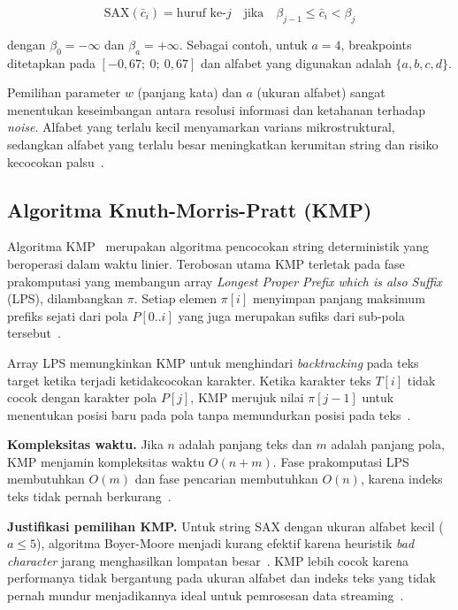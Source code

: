 \documentclass[conference]{IEEEtran}
\begin{document}
\begin{equation}
\text{SAX}(\bar{c}_i) = \text{huruf ke-}j \quad \text{jika} \quad \beta_{j-1} \leq \bar{c}_i < \beta_j
\label{eq:sax}
\end{equation}

\noindent dengan $\beta_0 = -\infty$ dan $\beta_a = +\infty$. Sebagai contoh, untuk $a = 4$, breakpoints ditetapkan pada $[-0{,}67;\ 0;\ 0{,}67]$ dan alfabet yang digunakan adalah $\{a, b, c, d\}$.

Pemilihan parameter $w$ (panjang kata) dan $a$ (ukuran alfabet) sangat menentukan keseimbangan antara resolusi informasi dan ketahanan terhadap \textit{noise}. Alfabet yang terlalu kecil menyamarkan varians mikrostruktural, sedangkan alfabet yang terlalu besar meningkatkan kerumitan string dan risiko kecocokan palsu~\cite{park2019}.

\subsection{Algoritma Knuth-Morris-Pratt (KMP)}

Algoritma KMP~\cite{knuth1977} merupakan algoritma pencocokan string deterministik yang beroperasi dalam waktu linier. Terobosan utama KMP terletak pada fase prakomputasi yang membangun array \textit{Longest Proper Prefix which is also Suffix} (LPS), dilambangkan $\pi$. Setiap elemen $\pi[i]$ menyimpan panjang maksimum prefiks sejati dari pola $P[0..i]$ yang juga merupakan sufiks dari sub-pola tersebut~\cite{knuth1977}.

Array LPS memungkinkan KMP untuk menghindari \textit{backtracking} pada teks target ketika terjadi ketidakcocokan karakter. Ketika karakter teks $T[i]$ tidak cocok dengan karakter pola $P[j]$, KMP merujuk nilai $\pi[j-1]$ untuk menentukan posisi baru pada pola tanpa memundurkan posisi pada teks~\cite{cormen2009}.

\textbf{Kompleksitas waktu.} Jika $n$ adalah panjang teks dan $m$ adalah panjang pola, KMP menjamin kompleksitas waktu $O(n+m)$. Fase prakomputasi LPS membutuhkan $O(m)$ dan fase pencarian membutuhkan $O(n)$, karena indeks teks tidak pernah berkurang~\cite{knuth1977}.

\textbf{Justifikasi pemilihan KMP.} Untuk string SAX dengan ukuran alfabet kecil ($a \leq 5$), algoritma Boyer-Moore menjadi kurang efektif karena heuristik \textit{bad character} jarang menghasilkan lompatan besar~\cite{boyer1977}. KMP lebih cocok karena performanya tidak bergantung pada ukuran alfabet dan indeks teks yang tidak pernah mundur menjadikannya ideal untuk pemrosesan data streaming~\cite{cormen2009}.
\end{document}
